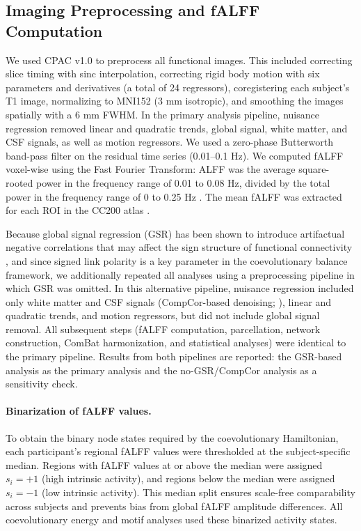 \documentclass[10pt,letterpaper]{article}
\begin{document}
\subsection*{Imaging Preprocessing and fALFF Computation}
We used CPAC v1.0 \cite{Craddock:2013cpac} to preprocess all functional images. This included
correcting slice timing with sinc interpolation, correcting rigid body motion with six parameters
and derivatives (a total of 24 regressors), coregistering each subject's T1 image, normalizing
to MNI152 (3 mm isotropic), and smoothing the images spatially with a 6 mm FWHM. In the primary
analysis pipeline, nuisance regression removed linear and quadratic trends, global signal, white
matter, and CSF signals, as well as motion regressors. We used a zero-phase Butterworth band-pass
filter on the residual time series (0.01--0.1 Hz). We computed fALFF voxel-wise using the Fast
Fourier Transform: ALFF was the average square-rooted power in the frequency range of 0.01 to
0.08 Hz, divided by the total power in the frequency range of 0 to 0.25 Hz
\cite{Zang:2007al,Zou:2008fa}. The mean fALFF was extracted for each ROI in the CC200 atlas
\cite{Craddock:2012atlas}.

Because global signal regression (GSR) has been shown to introduce artifactual negative correlations
that may affect the sign structure of functional connectivity \cite{Murphy2009,Fox2009,Chang2009},
and since signed link polarity is a key parameter in the coevolutionary balance framework, we
additionally repeated all analyses using a preprocessing pipeline in which GSR was omitted. In
this alternative pipeline, nuisance regression included only white matter and CSF signals
(CompCor-based denoising; \cite{Behzadi2007}), linear and quadratic trends, and motion regressors,
but did not include global signal removal. All subsequent steps (fALFF computation, parcellation,
network construction, ComBat harmonization, and statistical analyses) were identical to the primary
pipeline. Results from both pipelines are reported: the GSR-based analysis as the primary analysis
and the no-GSR/CompCor analysis as a sensitivity check.

\paragraph*{Binarization of fALFF values.}
To obtain the binary node states required by the coevolutionary Hamiltonian, each participant's
regional fALFF values were thresholded at the subject-specific median. Regions with fALFF values
at or above the median were assigned $s_i = +1$ (high intrinsic activity), and regions below the
median were assigned $s_i = -1$ (low intrinsic activity). This median split ensures scale-free
comparability across subjects and prevents bias from global fALFF amplitude differences. All
coevolutionary energy and motif analyses used these binarized activity states.
\end{document}
